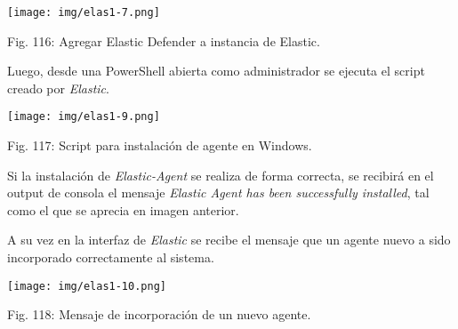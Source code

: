\documentclass[12pt,oneside,a4paper]{book}
\begin{document}
\vspace{2em}

\begin{center}
    \texttt{[image: img/elas1-7.png]}
    
\vspace{0.1em}
    
    Fig. 116: Agregar Elastic Defender a instancia de Elastic.
\end{center}

\vspace{2em}

\hspace{20pt}
Luego, desde una PowerShell abierta como administrador se ejecuta el script creado por \textit{Elastic}.

\vspace{2em}

\begin{center}
    \texttt{[image: img/elas1-9.png]}
    
\vspace{0.1em}
    
    Fig. 117: Script para instalación de agente en Windows.
\end{center}

\vspace{2em}

\hspace{20pt}
 Si la instalación de \textit{Elastic-Agent} se realiza de forma correcta, se recibirá en el output de consola el mensaje \textit{Elastic Agent has been successfully installed}, tal como el que se aprecia en imagen anterior.

\vspace{1em}

\hspace{20pt}
A su vez en la interfaz de \textit{Elastic} se recibe el mensaje que un agente nuevo a sido incorporado correctamente al sistema.

\vspace{2em}

\begin{center}
    \texttt{[image: img/elas1-10.png]}
    
\vspace{0.1em}
    
    Fig. 118: Mensaje de incorporación de un nuevo agente.
\end{center}

\vspace{2em}
\end{document}
